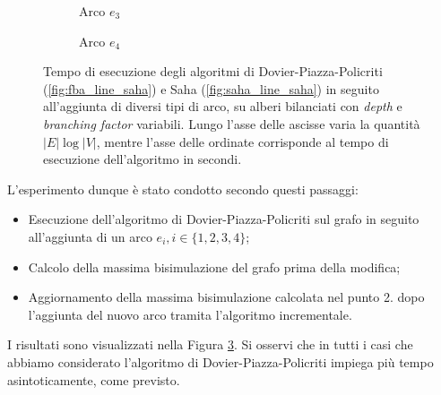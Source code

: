 \begin{figure}[H]
\begin{subfigure}[b]{0.49\textwidth}
            \caption{Arco $e_3$}
            \label{fig:saha_3_result}
        \end{subfigure}
        \begin{subfigure}[b]{0.49\textwidth}
            \caption{Arco $e_4$}
            \label{fig:saha_4_result}
        \end{subfigure}
    \caption{Tempo di esecuzione degli algoritmi di Dovier-Piazza-Policriti (\ref*{fig:fba_line_saha}) e Saha (\ref*{fig:saha_line_saha}) in seguito all'aggiunta di diversi tipi di arco, su alberi bilanciati con \emph{depth} e \emph{branching factor} variabili. Lungo l'asse delle ascisse varia la quantità $|E|\log|V|$, mentre l'asse delle ordinate corrisponde al tempo di esecuzione dell'algoritmo in secondi.}
    \label{fig:saha_result}
\end{figure}

L'esperimento dunque è stato condotto secondo questi passaggi:
\begin{itemize}
    \item Esecuzione dell'algoritmo di Dovier-Piazza-Policriti sul grafo in seguito all'aggiunta di un arco $e_i, i \in \{1,2,3,4\}$;
    \item Calcolo della massima bisimulazione del grafo prima della modifica;
    \item Aggiornamento della massima bisimulazione calcolata nel punto 2. dopo l'aggiunta del nuovo arco tramita l'algoritmo incrementale.
\end{itemize}

I risultati sono visualizzati nella Figura \ref{fig:saha_result}. Si osservi che in tutti i casi che abbiamo considerato l'algoritmo di Dovier-Piazza-Policriti impiega più tempo asintoticamente, come previsto.

